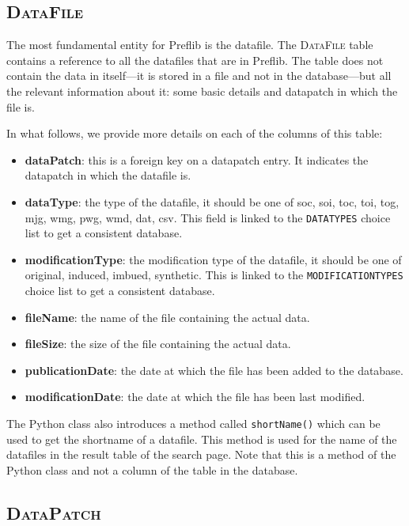 \documentclass{report}
\begin{document}
	\subsection*{\faDatabase{} \textsc{DataFile}}
	
	The most fundamental entity for Preflib is the datafile. The \textsc{DataFile} table contains a reference to all the datafiles that are in Preflib. The table does not contain the data in itself---it is stored in a file and not in the database---but all the relevant information about it: some basic details and datapatch in which the file is.
	
	In what follows, we provide more details on each of the columns of this table:
	\begin{itemize}
		\item \textbf{dataPatch}: this is a foreign key on a datapatch entry. It indicates the datapatch in which the datafile is.
		\item \textbf{dataType}: the type of the datafile, it should be one of soc, soi, toc, toi, tog, mjg, wmg, pwg, wmd, dat, csv. This field is linked to the \texttt{DATATYPES} choice list to get a consistent database.
		\item \textbf{modificationType}: the modification type of the datafile, it should be one of original, induced, imbued, synthetic. This is linked to the \texttt{MODIFICATIONTYPES} choice list to get a consistent database.
		\item \textbf{fileName}: the name of the file containing the actual data.
		\item \textbf{fileSize}: the size of the file containing the actual data.
		\item \textbf{publicationDate}: the date at which the file has been added to the database.
		\item \textbf{modificationDate}: the date at which the file has been last modified.
	\end{itemize}
	
	The Python class also introduces a method called \texttt{shortName()} which can be used to get the shortname of a datafile. This method is used for the name of the datafiles in the result table of the search page. Note that this is a method of the Python class and not a column of the table in the database.
	
	\subsection*{\faDatabase{} \textsc{DataPatch}}
	
\end{document}
